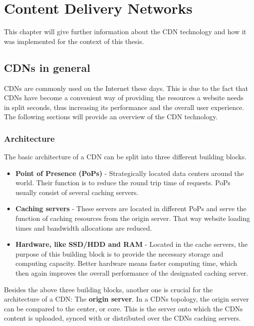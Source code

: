 \chapter{Content Delivery Networks} %
\label{Chapter3}


This chapter will give further information about the CDN technology and how it was implemented for the context of this thesis.

\section{CDNs in general}

CDNs are commonly used on the Internet these days. This is due to the fact that CDNs have become a convenient way of providing the resources a website needs in split seconds, thus increasing its performance and the overall user experience.\cite{cdn_general}
The following sections will provide an overview of the CDN technology.

\subsection{Architecture}

The basic architecture of a CDN can be split into three different building blocks.

\begin{itemize}
	\item \textbf{Point of Presence (PoPs)} - Strategically located data centers around the world. Their function is to reduce the round trip time of requests. PoPs usually consist of several caching servers.
	\item \textbf{Caching servers} - These servers are located in different PoPs and serve the function of caching resources from the origin server. That way website loading times and bandwidth allocations are reduced.
	\item \textbf{Hardware, like SSD/HDD and RAM} - Located in the cache servers, the purpose of this building block is to provide the necessary storage and computing capacity. Better hardware means faster computing time, which then again improves the overall performance of the designated caching server.
\end{itemize}

Besides the above three building blocks, another one is crucial for the architecture of a CDN: The \textbf{origin server}. In a CDNs topology, the origin server can be compared to the center, or core. This is the server onto which the CDNs content is uploaded, synced with or distributed over the CDNs caching servers.\cite{cdn_origin_server}

